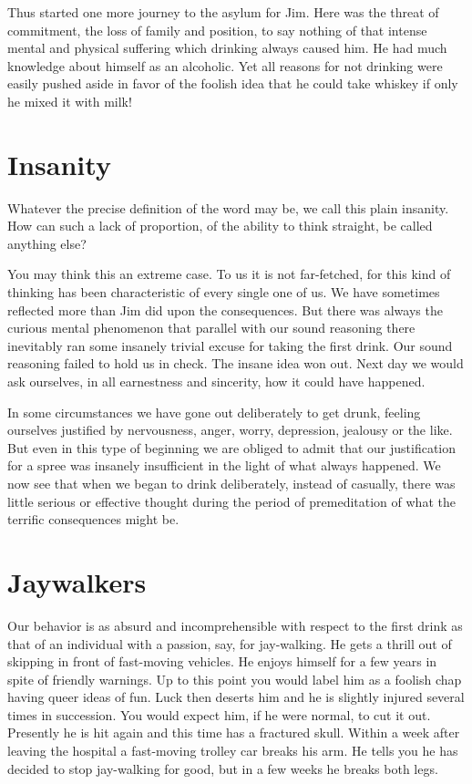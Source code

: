 Thus started one more journey to the asylum for Jim. 
Here was the threat of commitment, 
the loss of family and position, 
to say nothing of that intense mental and physical suffering 
which drinking always caused him. 
He had much knowledge about himself as an alcoholic. 
Yet all reasons for not drinking were easily pushed aside 
in favor of the foolish idea that he could take whiskey 
if only he mixed it with milk!


\section{Insanity}

Whatever the precise definition of the word may be, 
we call this plain insanity. 
How can such a lack of proportion, 
of the ability to think straight, 
be called anything else?

You may think this an extreme case. 
To us it is not far-fetched, 
for this kind of thinking has been characteristic of every single one of us. 
We have sometimes reflected more than Jim did upon the consequences. 
But there was always the curious mental phenomenon that parallel with our sound reasoning 
there inevitably ran some insanely trivial excuse for taking the first drink. 
Our sound reasoning failed to hold us in check. 
The insane idea won out. 
Next day we would ask ourselves, in all earnestness and sincerity, how it could have happened.

In some circumstances we have gone out deliberately to get drunk, 
feeling ourselves justified by nervousness, anger, worry, depression, jealousy or the like. 
But even in this type of beginning we are obliged to admit 
that our justification for a spree was insanely insufficient in the light of what always happened. 
We now see that when we began to drink deliberately, instead of casually, 
there was little serious or effective thought during the period of premeditation 
of what the terrific consequences might be.


\section{Jaywalkers}

Our behavior is as absurd and incomprehensible with respect to the first drink 
as that of an individual with a passion, say, for jay-walking. 
He gets a thrill out of skipping in front of fast-moving vehicles. 
He enjoys himself for a few years in spite of friendly warnings. 
Up to this point you would label him as a foolish chap having queer ideas of fun. 
Luck then deserts him and he is slightly injured several times in succession. 
You would expect him, if he were normal, to cut it out. 
Presently he is hit again and this time has a fractured skull. 
Within a week after leaving the hospital a fast-moving trolley car breaks his arm. 
He tells you he has decided to stop jay-walking for good, 
but in a few weeks he breaks both legs.

